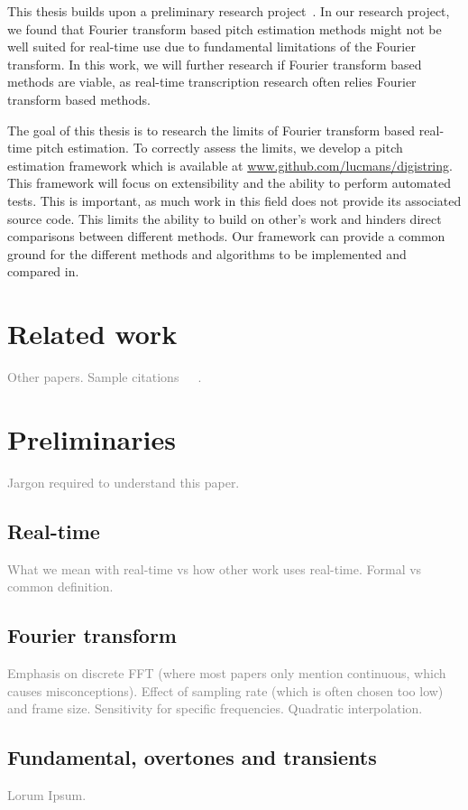 \documentclass[10pt,twocolumn]{article}
\begin{document}
This thesis builds upon a preliminary research project~\cite{ik}. In our research project, we found that Fourier transform based pitch estimation methods might not be well suited for real-time use due to fundamental limitations of the Fourier transform. In this work, we will further research if Fourier transform based methods are viable, as real-time transcription research often relies Fourier transform based methods.

The goal of this thesis is to research the limits of Fourier transform based real-time pitch estimation. To correctly assess the limits, we develop a pitch estimation framework which is available at \url{www.github.com/lucmans/digistring}. This framework will focus on extensibility and the ability to perform automated tests. This is important, as much work in this field does not provide its associated source code. This limits the ability to build on other's work and hinders direct comparisons between different methods. Our framework can provide a common ground for the different methods and algorithms to be implemented and compared in.


\section{Related work}
\textcolor{gray}{Other papers. Sample citations~\cite{mono}~\cite{window}~\cite{twotimes}.}


\section{Preliminaries}
\textcolor{gray}{Jargon required to understand this paper.}

\subsection{Real-time}
\textcolor{gray}{What we mean with real-time vs how other work uses real-time. Formal vs common definition.}

\subsection{Fourier transform}
\textcolor{gray}{Emphasis on discrete FFT (where most papers only mention continuous, which causes misconceptions). Effect of sampling rate (which is often chosen too low) and frame size. Sensitivity for specific frequencies. Quadratic interpolation.}

\subsection{Fundamental, overtones and transients}
\textcolor{gray}{Lorum Ipsum.}
\end{document}
